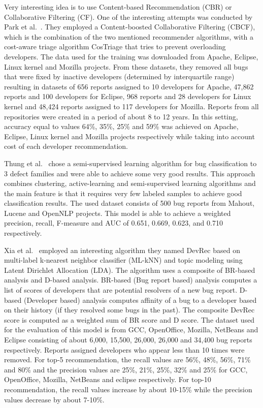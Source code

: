 Very interesting idea is to use Content-based Recommendation (CBR) or Collaborative Filtering (CF). One of the interesting attempts was conducted by Park et al.~\cite{Park2011}. They employed a Content-boosted Collaborative Filtering (CBCF), which is the combination of the two mentioned recommender algorithms, with a cost-aware triage algorithm CosTriage that tries to prevent overloading developers. The data used for the training was downloaded from Apache, Eclipse, Linux kernel and Mozilla projects. From these datasets, they removed all bugs that were fixed by inactive developers (determined by interquartile range) resulting in datasets of 656 reports assigned to 10 developers for Apache, 47,862 reports and 100 developers for Eclipse, 968 reports and 28 developers for Linux kernel and 48,424 reports assigned to 117 developers for Mozilla. Reports from all repositories were created in a period of about 8 to 12 years. In this setting, accuracy equal to values 64\%, 35\%, 25\% and 59\% was achieved on Apache, Eclipse, Linux kernel and Mozilla projects respectively while taking into account cost of each developer recommendation.

Thung et al.~\cite{Thung2015} chose a semi-supervised learning algorithm for bug classification to 3 defect families and were able to achieve some very good results. This approach combines clustering, active-learning and semi-supervised learning algorithms and the main feature is that it requires very few labeled samples to achieve good classification results. The used dataset consists of 500 bug reports from Mahout, Lucene and OpenNLP projects. This model is able to achieve a weighted precision, recall, F-measure and AUC of 0.651, 0.669, 0.623, and 0.710 respectively.

Xia et al.~\cite{Xia2015} employed an interesting algorithm they named DevRec based on multi-label k-nearest neighbor classifier (ML-kNN) and topic modeling using Latent Dirichlet Allocation (LDA). The algorithm uses a composite of BR-based analysis and D-based analysis. BR-based (Bug report based) analysis computes a list of scores of developers that are potential resolvers of a new bug report. D-based (Developer based) analysis computes affinity of a bug to a developer based on their history (if they resolved some bugs in the past). The composite DevRec score is computed as a weighted sum of BR score and D score. The dataset used for the evaluation of this model is from GCC, OpenOffice, Mozilla, NetBeans and Eclipse consisting of about 6,000, 15,500, 26,000, 26,000 and 34,400 bug reports respectively. Reports assigned developers who appear less than 10 times were removed. For top-5 recommendation, the recall values are 56\%, 48\%, 56\%, 71\% and 80\% and the precision values are 25\%, 21\%, 25\%, 32\% and 25\% for GCC, OpenOffice, Mozilla, NetBeans and eclipse respectively. For top-10 recommendation, the recall values increase by about 10-15\% while the precision values decrease by about 7-10\%.